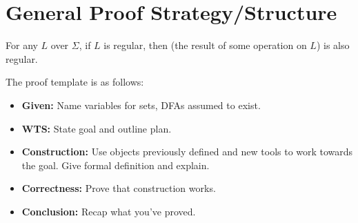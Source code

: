 \documentclass[letterpaper]{article}
\begin{document}
\newpage
\section{General Proof Strategy/Structure}
\begin{theorem}{}{}
    For any $L$ over $\Sigma$, if $L$ is regular, then (the result of some operation on $L$) is also regular.
\end{theorem}
The proof template is as follows:
\begin{mdframed}[]
    \begin{itemize}
        \item \textbf{Given:} Name variables for sets, DFAs assumed to exist. 
        \item \textbf{WTS:} State goal and outline plan.
        \item \textbf{Construction:} Use objects previously defined and new tools to work towards the goal. Give formal definition and explain. 
        \item \textbf{Correctness:} Prove that construction works. 
        \item \textbf{Conclusion:} Recap what you've proved. 
    \end{itemize}
\end{mdframed}
\end{document}
